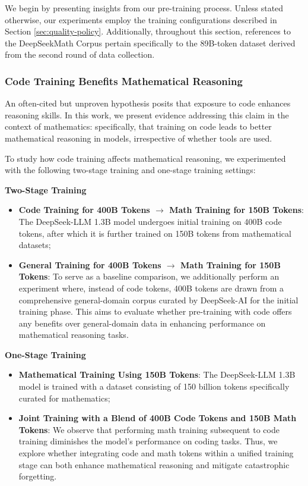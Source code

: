 \begin{itemize}[topsep=0pt]
\begin{itemize}[topsep=0pt]
We begin by presenting insights from our pre-training process. Unless stated otherwise, our experiments employ the training configurations described in Section \ref{sec:quality-policy}. Additionally, throughout this section, references to the DeepSeekMath Corpus pertain specifically to the 89B-token dataset derived from the second round of data collection.

\subsubsection{Code Training Benefits Mathematical Reasoning}

An often-cited but unproven hypothesis posits that exposure to code enhances reasoning skills. In this work, we present evidence addressing this claim in the context of mathematics: specifically, that training on code leads to better mathematical reasoning in models, irrespective of whether tools are used.

To study how code training affects mathematical reasoning, we experimented with the following two-stage training and one-stage training settings:

\textbf{Two-Stage Training}

\begin{itemize}[topsep=0pt]
    \item \textbf{Code Training for 400B Tokens $\rightarrow$ Math Training for 150B Tokens}: The DeepSeek-LLM 1.3B model undergoes initial training on 400B code tokens, after which it is further trained on 150B tokens from mathematical datasets;
    \item \textbf{General Training for 400B Tokens $\rightarrow$ Math Training for 150B Tokens}: To serve as a baseline comparison, we additionally perform an experiment where, instead of code tokens, 400B tokens are drawn from a comprehensive general-domain corpus curated by DeepSeek-AI for the initial training phase. This aims to evaluate whether pre-training with code offers any benefits over general-domain data in enhancing performance on mathematical reasoning tasks.
\end{itemize}

\textbf{One-Stage Training}

\begin{itemize}[topsep=0pt]
    \item \textbf{Mathematical Training Using 150B Tokens}: The DeepSeek-LLM 1.3B model is trained with a dataset consisting of 150 billion tokens specifically curated for mathematics;
    \item \textbf{Joint Training with a Blend of 400B Code Tokens and 150B Math Tokens}: We observe that performing math training subsequent to code training diminishes the model’s performance on coding tasks. Thus, we explore whether integrating code and math tokens within a unified training stage can both enhance mathematical reasoning and mitigate catastrophic forgetting.
\end{itemize}


\end{itemize}
\end{itemize}
